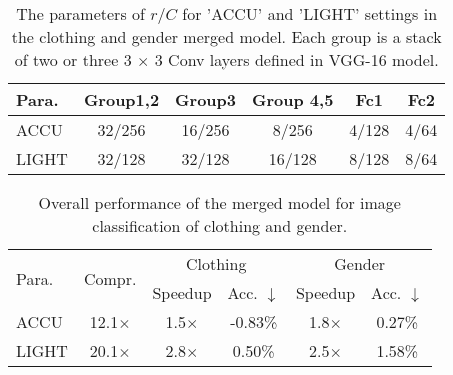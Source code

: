 \documentclass{article}
\begin{document}
	
	\begin{table}[t]
		\centering
		\small
		\caption{The parameters of $r/C$ for 'ACCU' and 'LIGHT' settings in the clothing and gender merged model. Each group is a stack of two or three 3 $\times$ 3 Conv layers defined in VGG-16 model.  }
		\label{Experimenttwo_param}
		\begin{tabular}{lccccc}
			\toprule
			Para.       & Group1,2    & Group3   & Group 4,5  & Fc1    & Fc2             \\ \hline
			ACCU        & 32/256      & 16/256   & 8/256      & 4/128  & 4/64          \\
			LIGHT       & 32/128      & 32/128   & 16/128     & 8/128  & 8/64    \\
			\bottomrule
		\end{tabular}
	\end{table}
	
	
	\begin{table}[t]
		\centering
		\small
		\caption{Overall performance of the merged model for image classification of clothing and gender.}
		\label{TwoMerge}
		\begin{tabular}{lccccc}
			\toprule
			\multirow{2}{*}{Para.} & \multirow{2}{*}{Compr.} & \multicolumn{2}{c}{Clothing} & \multicolumn{2}{c}{Gender} \\
			&                              & Speedup      & Acc. $\downarrow$      & Speedup     & Acc. $\downarrow$     \\ \hline
			ACCU                      & 12.1$\times$                        & 1.5$\times$         & -0.83\%         & 1.8$\times$        & 0.27\%
			\\
			LIGHT                      & 20.1$\times$                        & 2.8$\times$         & 0.50\%         & 2.5$\times$         & 1.58\%          \\
			
			\bottomrule
		\end{tabular}
	\end{table}
	
\end{document}
